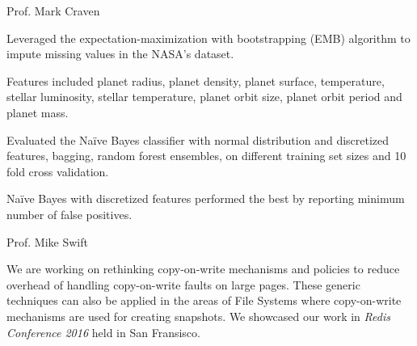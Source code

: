 \documentclass[letterpaper]{deedy-resume} %
\begin{document}
\begin{minipage}[t]{0.76\textwidth}
\begin{tightitemize}
\item Prof. Mark Craven
\item Leveraged the expectation-maximization with bootstrapping (EMB) algorithm to impute missing values in the NASA's dataset.
\item Features included planet radius, planet density, planet surface, temperature, stellar luminosity, stellar temperature, planet orbit size, planet orbit period and planet mass.
\item Evaluated the Naïve Bayes classifier with normal distribution and discretized features, bagging, random forest ensembles, on different training set sizes and 10 fold cross validation.
\item Naïve Bayes with discretized features performed the best by reporting minimum number of false positives.
\end{tightitemize}

\begin{tightitemize}
\item Prof. Mike Swift
\item  We are working on rethinking copy-on-write mechanisms and policies to reduce overhead of handling copy-on-write
    faults on large pages. These generic techniques can also be applied in the areas of File Systems where copy-on-write
    mechanisms are used for creating snapshots. We showcased our work in \textit{Redis Conference 2016} held in San Fransisco.
\end{tightitemize}


\end{minipage}
\end{document}
